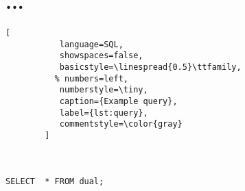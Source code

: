\chapter{...}	%

\begin{lstlisting}[
           language=SQL,
           showspaces=false,
           basicstyle=\linespread{0.5}\ttfamily,
          % numbers=left,
           numberstyle=\tiny,
           caption={Example query},
           label={lst:query},
           commentstyle=\color{gray}
        ] 



SELECT  * FROM dual;

\end{lstlisting}

\endinput